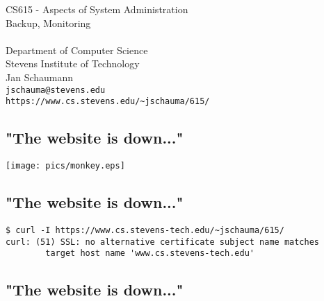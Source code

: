 \documentclass[xga]{xdvislides}
\begin{document}
\setfontphv

\lhead{\slidetitle}                               %
\cfoot{\relax}                               %
\rfoot{\Gray{\today}}

\newcommand{\smallish}{\fontsize{16}{16}\selectfont}

\vspace*{\fill}
\begin{center}
	\Hugesize
		CS615 - Aspects of System Administration\\ [1em]
		Backup, Monitoring\\ [1em]
	\hspace*{5mm}\blueline\\ [1em]
	\Normalsize
		Department of Computer Science\\
		Stevens Institute of Technology\\
		Jan Schaumann\\
		\verb+jschauma@stevens.edu+\\
		\verb+https://www.cs.stevens.edu/~jschauma/615/+
\end{center}
\vspace*{\fill}

\subsection{"The website is down..."}
\begin{center}
	\texttt{[image: pics/monkey.eps]}
\end{center}

\subsection{"The website is down..."}

\begin{verbatim}
$ curl -I https://www.cs.stevens-tech.edu/~jschauma/615/
curl: (51) SSL: no alternative certificate subject name matches
        target host name 'www.cs.stevens-tech.edu'
\end{verbatim}

\subsection{"The website is down..."}
\end{document}
